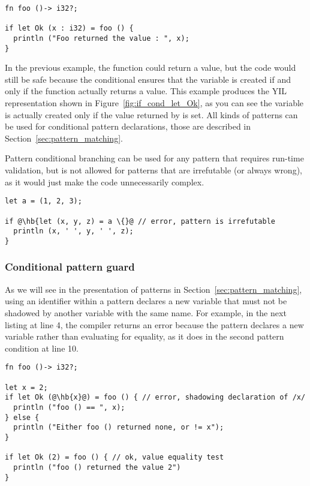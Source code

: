 

\begin{lstlisting}[style=coloredverbatim, label=lst:if_cond_let_Ok, caption=Example of conditional pattern]
fn foo ()-> i32?;

if let Ok (x : i32) = foo () {
  println ("Foo returned the value : ", x);
}
\end{lstlisting}

In the previous example, the function  could return a 
value, but the code would still be safe because the conditional ensures that the
variable  is created if and only if the function actually returns a
value. This example produces the YIL representation shown in
Figure~\ref{fig:if_cond_let_Ok}, as you can see the variable  is
actually created only if the value returned by  is set. All kinds of
patterns can be used for conditional pattern declarations, those are described
in Section~\ref{sec:pattern_matching}.


Pattern conditional branching can be used for any pattern that requires run-time
validation, but is not allowed for patterns that are irrefutable (or always
wrong), as it would just make the code unnecessarily complex.

\begin{lstlisting}[style=coloredverbatim, escapechar=@]
let a = (1, 2, 3);

if @\hb{let (x, y, z) = a \{}@ // error, pattern is irrefutable
  println (x, ' ', y, ' ', z);
}
\end{lstlisting}

\subsubsection{Conditional pattern guard}

As we will see in the presentation of patterns in
Section~\ref{sec:pattern_matching}, using an identifier within a pattern
declares a new variable that must not be shadowed by another variable with the
same name. For example, in the next listing at line 4, the compiler returns an
error because the pattern declares a new variable  rather than
evaluating for equality, as it does in the second pattern condition at line 10.

\begin{lstlisting}[style=coloredverbatim, escapechar=@]
fn foo ()-> i32?;

let x = 2;
if let Ok (@\hb{x}@) = foo () { // error, shadowing declaration of /x/
  println ("foo () == ", x);
} else {
  println ("Either foo () returned none, or != x");
}

if let Ok (2) = foo () { // ok, value equality test
  println ("foo () returned the value 2")
}
\end{lstlisting}

